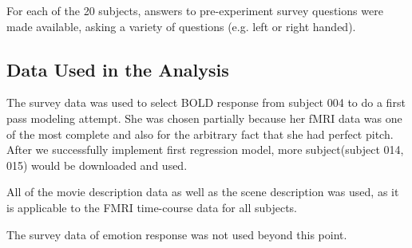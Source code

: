 \par For each of the 20 subjects, answers to pre-experiment survey questions were made available, asking a variety of questions (e.g. left or right handed). 


\subsection{Data Used in the Analysis}
\par The survey data was used to select BOLD response from subject 004 to do a first pass modeling attempt. She was chosen partially because her fMRI data was one of the most complete and also for the arbitrary fact that she had perfect pitch. After we successfully implement first regression model, more subject(subject 014, 015) would be downloaded and used.

\par All of the movie description data as well as the scene description was used, as it is applicable to the FMRI time-course data for all subjects. 

\par The survey data of emotion response was not used beyond this point.







